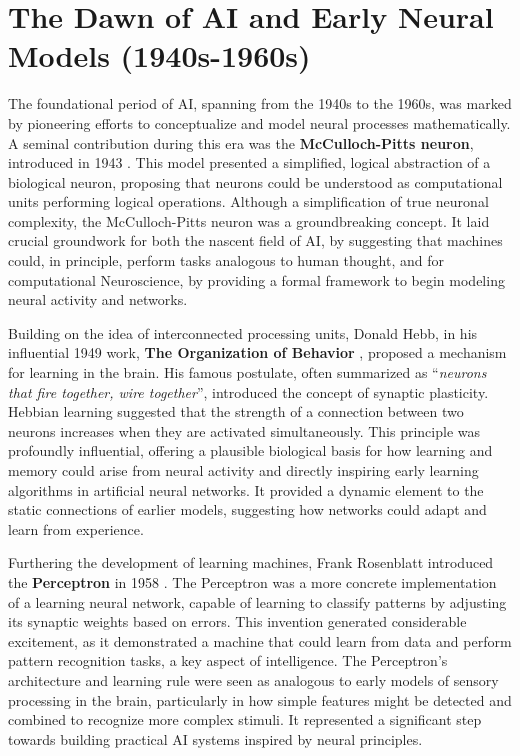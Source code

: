 \section{The Dawn of AI and Early Neural Models (1940s-1960s)}

The foundational period of AI, spanning from the 1940s to the 1960s, was marked by pioneering efforts to conceptualize and model neural processes mathematically. A seminal contribution during this era was the \textbf{McCulloch-Pitts neuron}, introduced in 1943 \cite{mcculloch1943logical}. This model presented a simplified, logical abstraction of a biological neuron, proposing that neurons could be understood as computational units performing logical operations. Although a simplification of true neuronal complexity, the McCulloch-Pitts neuron was a groundbreaking concept. It laid crucial groundwork for both the nascent field of AI, by suggesting that machines could, in principle, perform tasks analogous to human thought, and for computational Neuroscience, by providing a formal framework to begin modeling neural activity and networks.

Building on the idea of interconnected processing units, Donald Hebb, in his influential 1949 work, \textbf{The Organization of Behavior} \cite{hebb1949organization}, proposed a mechanism for learning in the brain. His famous postulate, often summarized as ``\textit{neurons that fire together, wire together}'', introduced the concept of synaptic plasticity. Hebbian learning suggested that the strength of a connection between two neurons increases when they are activated simultaneously. This principle was profoundly influential, offering a plausible biological basis for how learning and memory could arise from neural activity and directly inspiring early learning algorithms in artificial neural networks. It provided a dynamic element to the static connections of earlier models, suggesting how networks could adapt and learn from experience.

Furthering the development of learning machines, Frank Rosenblatt introduced the \textbf{Perceptron} in 1958 \cite{rosenblatt1958perceptron}. The Perceptron was a more concrete implementation of a learning neural network, capable of learning to classify patterns by adjusting its synaptic weights based on errors. This invention generated considerable excitement, as it demonstrated a machine that could learn from data and perform pattern recognition tasks, a key aspect of intelligence. The Perceptron's architecture and learning rule were seen as analogous to early models of sensory processing in the brain, particularly in how simple features might be detected and combined to recognize more complex stimuli. It represented a significant step towards building practical AI systems inspired by neural principles.

